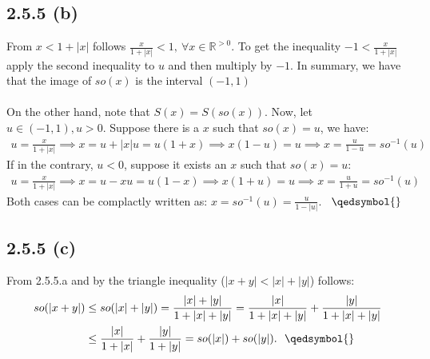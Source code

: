 \documentclass{exam}
\begin{document}
\subsection*{2.5.5 (b)}
From $x < 1 + |x|$ follows $\frac{x}{1 + |x|} < 1, \ \forall x \in \mathbb{R}^{>0}$. To get the inequality $-1 < \frac{x}{1 + |x|}$ apply the second inequality to $u$ and then 
multiply by $-1$. In summary, we have that the image of $so(x)$ is the interval $(-1,1)$\\
\\
On the other hand, note that $S(x) = S(so(x))$. Now, let $u \in (-1,1), u > 0$. Suppose there is a $x$ such that $so(x) = u$, we have:
\begin{equation*}
    \begin{aligned}
        u = \frac{x}{1 + |x|} \implies x = u + |x| u = u (1 + x) \implies x(1 - u) = u \implies x = \frac{u}{1 - u} = so^{-1}(u)
    \end{aligned}    
\end{equation*}
If in the contrary, $u < 0$, suppose it exists an $x$ such that $so(x) = u$:
\begin{equation*}
    \begin{aligned}
        u = \frac{x}{1 + |x|} \implies x = u - x u = u (1 - x) \implies x(1 + u) = u \implies x = \frac{u}{1 + u} = so^{-1}(u)
    \end{aligned}    
\end{equation*}
Both cases can be complactly written as: $x = so^{-1}(u) = \frac{u}{1 - |u|}$. \ $\qedsymbol{}$

\subsection*{2.5.5 (c)}
From 2.5.5.a and by the triangle inequality ($|x + y| < |x| + |y|$) follows:
\begin{equation*}
    \begin{aligned}
        so(|x + y|) &\leq so(|x| + |y|) = \frac{|x| + |y|}{1 + |x| + |y|} = \frac{|x|}{1 + |x| + |y|} + \frac{|y|}{1 + |x| + |y|} \\
                    &\leq \frac{|x|}{1 + |x|} + \frac{|y|}{1 + |y|} = so(|x|) + so(|y|). \ \ \qedsymbol{}
    \end{aligned}    
\end{equation*}
\end{document}
